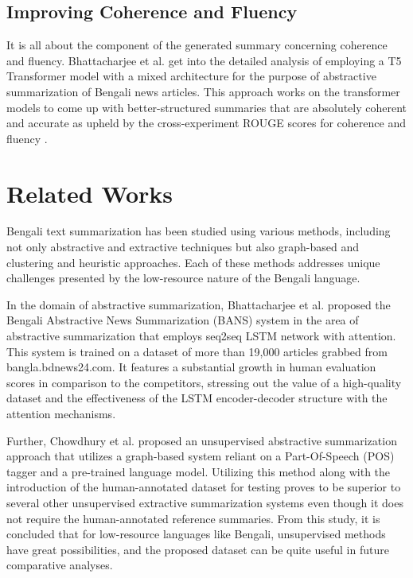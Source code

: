 \documentclass[12pt]{report}
\begin{document}
\subsection*{Improving Coherence and Fluency}
It is all about the component of the generated summary concerning coherence and fluency. Bhattacharjee et al. get into the detailed analysis of employing a T5 Transformer model with a mixed architecture for the purpose of abstractive summarization of Bengali news articles. This approach works on the transformer models to come up with better-structured summaries that are absolutely coherent and accurate as upheld by the cross-experiment ROUGE scores for coherence and fluency \cite{hasib2023bengali}.

\section*{Related Works}
Bengali text summarization has been studied using various methods, including not only abstractive and extractive techniques but also graph-based and clustering and heuristic approaches. Each of these methods addresses unique challenges presented by the low-resource nature of the Bengali language.

In the domain of abstractive summarization, Bhattacharjee et al. \cite{bhattacharjee2021bengali} proposed the Bengali Abstractive News Summarization (BANS) system in the area of abstractive summarization that employs seq2seq LSTM network with attention. This system is trained on a dataset of more than 19,000 articles grabbed from bangla.bdnews24.com. It features a substantial growth in human evaluation scores in comparison to the competitors, stressing out the value of a high-quality dataset and the effectiveness of the LSTM encoder-decoder structure with the attention mechanisms.

Further, Chowdhury et al. \cite{chowdhury2021unsupervised} proposed an unsupervised abstractive summarization approach that utilizes a graph-based system reliant on a Part-Of-Speech (POS) tagger and a pre-trained language model. Utilizing this method along with the introduction of the human-annotated dataset for testing proves to be superior to several other unsupervised extractive summarization systems even though it does not require the human-annotated reference summaries. From this study, it is concluded that for low-resource languages like Bengali, unsupervised methods have great possibilities, and the proposed dataset can be quite useful in future comparative analyses.
\end{document}
